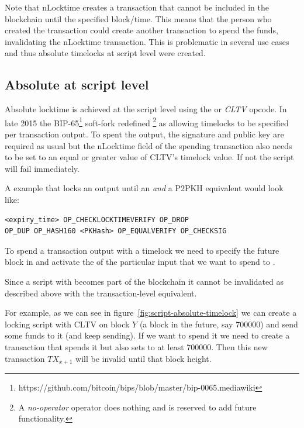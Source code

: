 Note that nLocktime creates a transaction that cannot be included in the blockchain until the specified block/time. This means that the person who created the transaction could create another transaction to spend the funds, invalidating the nLocktime transaction. This is problematic in several use cases and thus absolute timelocks at script level were created.


\subsection*{Absolute at script level}
Absolute locktime is achieved at the script level using the  or \emph{CLTV} opcode. In late 2015 the BIP-65\footnote{https://github.com/bitcoin/bips/blob/master/bip-0065.mediawiki} soft-fork redefined \footnote{A \emph{no-operator} operator does nothing and is reserved to add future functionality.} as  allowing timelocks to be specified per transaction output. To spent the output, the signature and public key are required as usual but the nLocktime field of the spending transaction also needs to be set to an equal or greater value of CLTV’s timelock value. If not the script will fail immediately.

A  example that locks an output until an  \emph{and} a P2PKH equivalent would look like:

\begin{emphbox}
\begin{verbatim}
<expiry_time> OP_CHECKLOCKTIMEVERIFY OP_DROP 
OP_DUP OP_HASH160 <PKHash> OP_EQUALVERIFY OP_CHECKSIG
\end{verbatim}
\end{emphbox}

To spend a transaction output with a timelock we need to specify the future block in  and activate the  of the particular input that we want to spend to .

\begin{note}
Since a script with  becomes part of the blockchain it cannot be invalidated as described above with the transaction-level equivalent. 
\end{note}

For example, as we can see in figure~\ref{fig:script-absolute-timelock} we can create a locking script with CLTV on block $Y$ (a block in the future, say 700000) and send some funds to it (and keep sending). If we want to spend it we need to create a transaction that spends it but also sets  to at least 700000. Then this new transaction $TX_{x+1}$ will be invalid until that block height.

